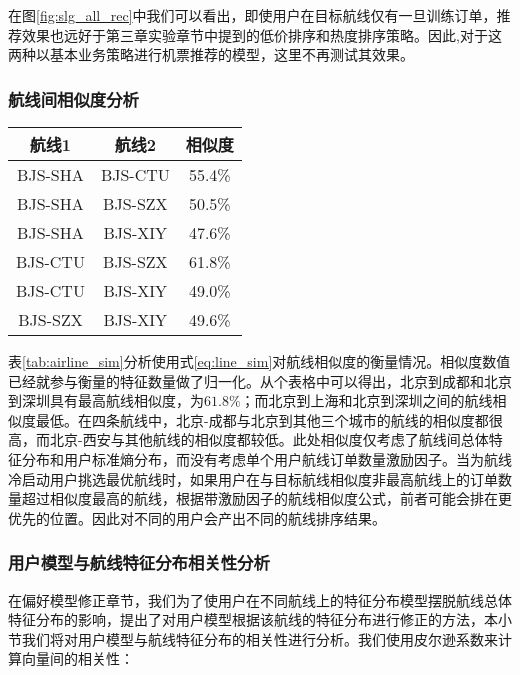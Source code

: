 在图\ref{fig:slg_all_rec}中我们可以看出，即使用户在目标航线仅有一旦训练订单，推荐效果也远好于第三章实验章节中提到的低价排序和热度排序策略。因此,对于这两种以基本业务策略进行机票推荐的模型，这里不再测试其效果。

\subsubsection{航线间相似度分析}

\begin{table}[!hpb]
  \centering
  \begin{tabular}{|c|c|c|} \hline 
    航线1& 航线2 & 相似度\\ \hline
    BJS-SHA & BJS-CTU & 55.4\% \\ \hline
    BJS-SHA & BJS-SZX & 50.5\% \\ \hline
    BJS-SHA & BJS-XIY & 47.6\% \\ \hline
    BJS-CTU & BJS-SZX & 61.8\% \\ \hline
    BJS-CTU & BJS-XIY & 49.0\% \\ \hline
    BJS-SZX & BJS-XIY & 49.6\% \\ \hline
  \end{tabular}
\end{table}

表\ref{tab:airline_sim}分析使用式\ref{eq:line_sim}对航线相似度的衡量情况。相似度数值已经就参与衡量的特征数量做了归一化。从个表格中可以得出，北京到成都和北京到深圳具有最高航线相似度，为$61.8\%$；而北京到上海和北京到深圳之间的航线相似度最低。在四条航线中，北京-成都与北京到其他三个城市的航线的相似度都很高，而北京-西安与其他航线的相似度都较低。此处相似度仅考虑了航线间总体特征分布和用户标准熵分布，而没有考虑单个用户航线订单数量激励因子。当为航线冷启动用户挑选最优航线时，如果用户在与目标航线相似度非最高航线上的订单数量超过相似度最高的航线，根据带激励因子的航线相似度公式，前者可能会排在更优先的位置。因此对不同的用户会产出不同的航线排序结果。

\subsubsection{用户模型与航线特征分布相关性分析}

在偏好模型修正章节，我们为了使用户在不同航线上的特征分布模型摆脱航线总体特征分布的影响，提出了对用户模型根据该航线的特征分布进行修正的方法，本小节我们将对用户模型与航线特征分布的相关性进行分析。我们使用皮尔逊系数来计算向量间的相关性：

